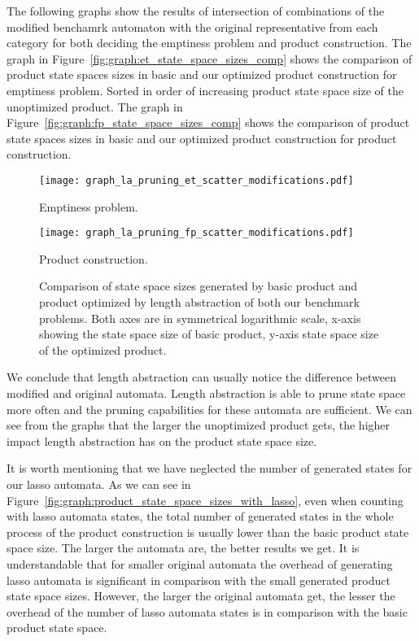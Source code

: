 The following graphs show the results of intersection of combinations of the modified benchamrk automaton with the original representative from each category for both deciding the emptiness problem and product construction. The graph in Figure~\ref{fig:graph:et_state_space_sizes_comp} shows the comparison of product state spaces sizes in basic and our optimized product construction for emptiness problem. Sorted in order of increasing product state space size of the unoptimized product. The graph in Figure~\ref{fig:graph:fp_state_space_sizes_comp} shows the comparison of product state spaces sizes in basic and our optimized product construction for product construction.

\begin{figure*}[ht]
    \centering
    \begin{minipage}{0.49\linewidth}
        \centering
        \texttt{[image: graph\_la\_pruning\_et\_scatter\_modifications.pdf]}
        \caption{Emptiness problem.}
        \label{fig:graph:et_state_space_sizes_comp}
    \end{minipage}
    \hfill
    \begin{minipage}{0.49\linewidth}
        \centering
        \texttt{[image: graph\_la\_pruning\_fp\_scatter\_modifications.pdf]}
        \caption{Product construction.}
        \label{fig:graph:fp_state_space_sizes_comp}
    \end{minipage}
    \vspace{0.5cm}
    \caption{Comparison of state space sizes generated by basic product and product optimized by length abstraction of both our benchmark problems. Both axes are in symmetrical logarithmic scale, x-axis showing the state space size of basic product, y-axis state space size of the optimized product.}
    \label{fig:graph:product_state_space_sizes}
\end{figure*}

We conclude that length abstraction can usually notice the difference between modified and original automata. Length abstraction is able to prune state space more often and the pruning capabilities for these automata are sufficient. We can see from the graphs that the larger the unoptimized product gets, the higher impact length abstraction has on the product state space size.

It is worth mentioning that we have neglected the number of generated states for our lasso automata. As we can see in Figure~\ref{fig:graph:product_state_space_sizes_with_lasso}, even when counting with lasso automata states, the total number of generated states in the whole process of the product construction is usually lower than the basic product state space size. The larger the automata are, the better results we get. It is understandable that for smaller original automata the overhead of generating lasso automata is significant in comparison with the small generated product state space sizes. However, the larger the original automata get, the lesser the overhead of the number of lasso automata states is in comparison with the basic product state space.

